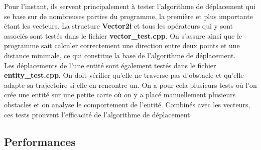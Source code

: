 \documentclass[11pt]{article} %
\begin{document}
Pour l'instant, ils servent principalement à tester l'algorithme de déplacement qui se base sur de nombreuses parties du programme, la première et plus importante étant les vecteurs. La structure \textbf{Vector2i} et tous les opérateurs qui y sont associés sont testés dans le fichier \textbf{vector\_test.cpp}. On s'assure ainsi que le programme sait calculer correctement une direction entre deux points et une distance minimale, ce qui constitue la base de l'algorithme de déplacement. \\
Les déplacements de l'une entité sont également testés dans le fichier \textbf{entity\_test.cpp}. On doit vérifier qu'elle ne traverse pas d'obstacle et qu'elle adapte sa trajectoire si elle en rencontre un. On a pour cela plusieurs tests où l'on crée une entité sur une petite carte où on y a placé manuellement plusieurs obstacles et on analyse le comportement de l'entité. Combinés avec les vecteurs, ces tests prouvent l'efficacité de l'algorithme de déplacement.

\subsection{Performances}
\end{document}
